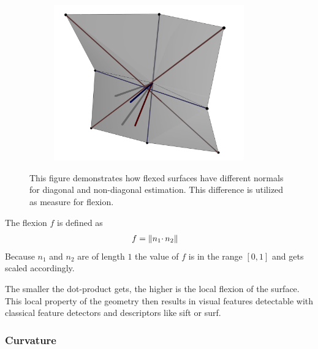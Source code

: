 \begin{figure}[H]
    \begin{subfigure}[t]{0.49\linewidth}
        \includegraphics[width=0.9\textwidth]{chapter04/img/scetch_flexion.png}
    \end{subfigure}
    \begin{subfigure}[t]{0.49\linewidth}
        
    \end{subfigure}
    \caption[Schematic Representation of Flexion]{This figure demonstrates how flexed surfaces have different normals for diagonal and non-diagonal estimation. This difference is utilized as measure for flexion.}%
    \label{fig:flexion-image-scetched}
\end{figure}

The flexion $f$ is defined as
\begin{align}
    f &= \lVert n_1 \cdotp n_2\rVert
\end{align}
Because $n_1$ and $n_2$ are of length $1$ the value of $f$ is in the range $[0, 1]$ and gets scaled accordingly.

The smaller the dot-product gets, the higher is the local flexion of the
surface. This local property of the geometry then results in visual
features detectable with classical feature detectors and descriptors like
\Gls{sift} or \Gls{surf}.

\subsubsection{Curvature}

